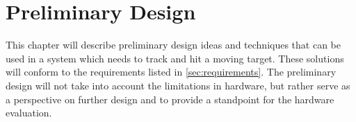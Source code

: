 \chapter{Preliminary Design}\label{ch:preldesign}
This chapter will describe preliminary design ideas and techniques that can be used in a system which needs to track and hit a moving target. These solutions will conform to the requirements listed in \cref{sec:requirements}. The preliminary design will not take into account the limitations in hardware, but rather serve as a perspective on further design and to provide a standpoint for the hardware evaluation.


